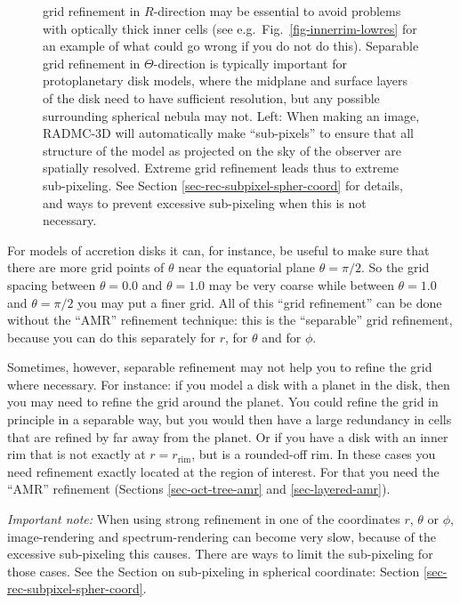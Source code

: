 \documentclass{report}
\begin{document}
\begin{figure}
{  grid refinement in $R$-direction may be essential to avoid problems with
  optically thick inner cells (see e.g.\ Fig.\ \ref{fig-innerrim-lowres} for
  an example of what could go wrong if you do not do this). Separable grid
  refinement in $\Theta$-direction is typically important for protoplanetary
  disk models, where the midplane and surface layers of the disk need to
  have sufficient resolution, but any possible surrounding spherical nebula
  may not. Left: When making an image, RADMC-3D will automatically make
  ``sub-pixels'' to ensure that all structure of the model as projected on
  the sky of the observer are spatially resolved.  Extreme grid refinement
  leads thus to extreme sub-pixeling. See Section
  \ref{sec-rec-subpixel-spher-coord} for details, and ways to prevent
  excessive sub-pixeling when this is not necessary.}
\end{figure}
%

For models of accretion disks it can, for instance, be useful to make sure
that there are more grid points of $\theta$ near the equatorial plane
$\theta=\pi/2$. So the grid spacing between $\theta=0.0$ and $\theta=1.0$
may be very coarse while between $\theta=1.0$ and $\theta=\pi/2$ you may
put a finer grid. All of this ``grid refinement'' can be done without
the ``AMR'' refinement technique: this is the ``separable'' grid refinement,
because you can do this separately for $r$, for $\theta$ and for $\phi$.

Sometimes, however, separable refinement may not help you to refine the grid
where necessary. For instance: if you model a disk with a planet in the
disk, then you may need to refine the grid around the planet. You could
refine the grid in principle in a separable way, but you would then have a
large redundancy in cells that are refined by far away from the planet.  Or
if you have a disk with an inner rim that is not exactly at
$r=r_{\mathrm{rim}}$, but is a rounded-off rim. In these cases you need
refinement exactly located at the region of interest. For that you need the
``AMR'' refinement (Sections \ref{sec-oct-tree-amr} and \ref{sec-layered-amr}).

{\em Important note:} When using strong refinement in one of the coordinates
$r$, $\theta$ or $\phi$, image-rendering and spectrum-rendering can become
very slow, because of the excessive sub-pixeling this causes. There are ways
to limit the sub-pixeling for those cases. See the Section on sub-pixeling
in spherical coordinate: Section \ref{sec-rec-subpixel-spher-coord}.
\end{document}
